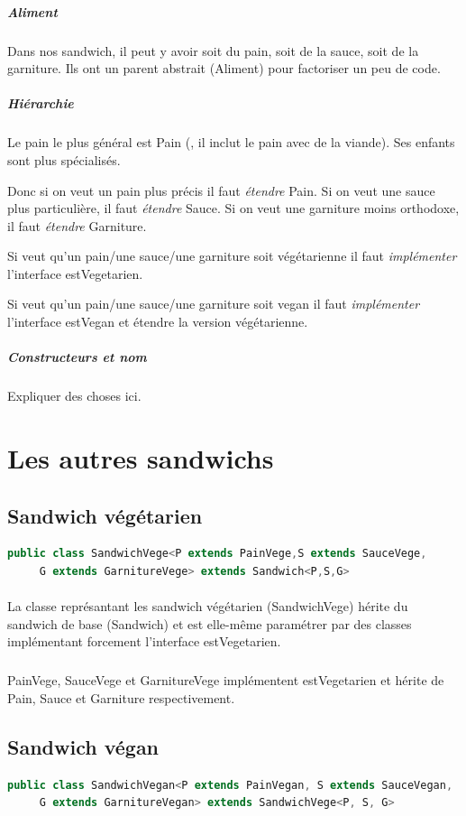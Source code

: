 \documentclass[a4paper]{article}
\begin{document}
\paragraph{}
\subparagraph{Aliment}
Dans nos sandwich, il peut y avoir soit du pain, soit de la sauce, soit de la garniture. Ils ont un parent abstrait (Aliment) pour factoriser un peu de code.

\subparagraph*{Hiérarchie}
Le pain le plus général est Pain (, il inclut le pain avec de la viande). Ses enfants sont plus spécialisés.

Donc si on veut un pain plus précis il faut \emph{étendre} Pain. Si on veut une sauce plus particulière, il faut \emph{étendre} Sauce. Si on veut une garniture moins orthodoxe, il faut \emph{étendre} Garniture.

Si veut qu'un pain/une sauce/une garniture soit végétarienne il faut \emph{implémenter} l'interface estVegetarien.

Si veut qu'un pain/une sauce/une garniture soit vegan il faut \emph{implémenter} l'interface estVegan et étendre la version végétarienne.

\subparagraph*{Constructeurs et nom}
Expliquer des choses ici.

\clearpage
\section{Les autres sandwichs}

\subsection{Sandwich végétarien}
\begin{lstlisting}[language=Java, caption=Entête de la classe SandwichVege]
    public class SandwichVege<P extends PainVege,S extends SauceVege,
     G extends GarnitureVege> extends Sandwich<P,S,G>
\end{lstlisting}
\paragraph{}
La classe représantant les sandwich végétarien (SandwichVege) hérite du sandwich de base (Sandwich) et est elle-même paramétrer par des classes implémentant forcement l'interface estVegetarien.
\subparagraph{}
PainVege, SauceVege et GarnitureVege implémentent estVegetarien et hérite de Pain, Sauce et Garniture respectivement.

\subsection{Sandwich végan}
\begin{lstlisting}[language=Java, caption=Entête de la classe SandwichVegan]
    public class SandwichVegan<P extends PainVegan, S extends SauceVegan,
     G extends GarnitureVegan> extends SandwichVege<P, S, G>
\end{lstlisting}
\end{document}
